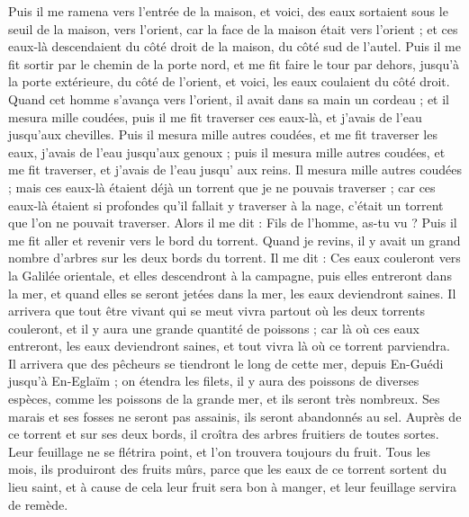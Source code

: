 \begin{multicols}{2}
\VerseOne{}Puis il me ramena vers l'entrée de la maison, et voici, des eaux sortaient sous le seuil de la maison, vers l'orient, car la face de la maison était vers l'orient ; et ces eaux-là descendaient du côté droit de la maison, du côté sud de l'autel.
Puis il me fit sortir par le chemin de la porte nord, et me fit faire le tour par dehors, jusqu'à la porte extérieure, du côté de l’orient, et voici, les eaux coulaient du côté droit.
Quand cet homme s’avança vers l'orient, il avait dans sa main un cordeau ; et il mesura mille coudées, puis il me fit traverser ces eaux-là, et j’avais de l’eau jusqu'aux chevilles.
Puis il mesura mille autres coudées, et me fit traverser les eaux, j’avais de l’eau jusqu'aux genoux ; puis il mesura mille autres coudées, et me fit traverser, et j’avais de l’eau  jusqu’ aux reins.
Il mesura mille autres coudées ; mais ces eaux-là étaient déjà un torrent que je ne pouvais traverser ; car ces eaux-là étaient si profondes qu'il fallait y traverser à la nage, c’était un torrent que l'on ne pouvait traverser.
Alors il me dit : Fils de l’homme, as-tu vu ? Puis il me fit aller et revenir vers le bord du torrent.
Quand je revins, il y avait un grand nombre d'arbres sur les deux bords du torrent.
Il me dit : Ces eaux couleront vers la Galilée orientale, et elles descendront à la campagne, puis elles entreront dans la mer, et quand elles se seront jetées dans la mer, les eaux deviendront saines.
Il arrivera que tout être vivant qui se meut vivra partout où les deux torrents couleront, et il y aura une grande quantité de poissons ; car là où ces eaux entreront, les eaux deviendront saines, et tout vivra là où ce torrent parviendra.
Il arrivera que des pêcheurs se tiendront le long de cette mer, depuis En-Guédi jusqu’à En-Eglaïm ; on étendra les filets, il y aura des poissons de diverses espèces, comme les poissons de la grande mer, et ils seront très nombreux.
Ses marais et ses fosses ne seront pas assainis, ils seront abandonnés au sel.
Auprès de ce torrent et sur ses deux bords, il croîtra des arbres fruitiers de toutes sortes. Leur feuillage ne se flétrira point, et l'on trouvera toujours du fruit. Tous les mois, ils produiront des fruits mûrs, parce que les eaux de ce torrent sortent du lieu saint, et à cause de cela leur fruit sera bon à manger, et leur feuillage servira de remède.

\end{multicols}
